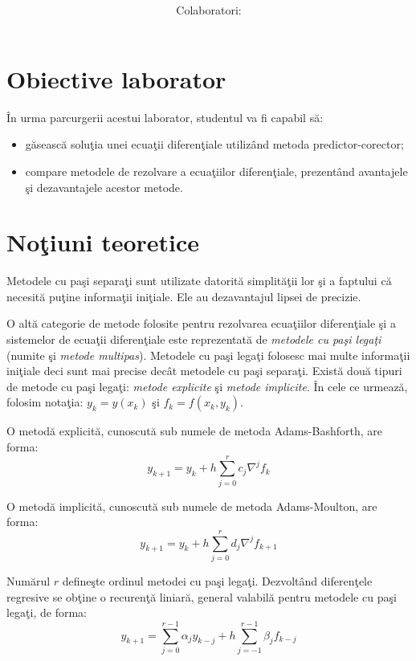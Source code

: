\documentclass{exam}
\title{
	\textmd{\textbf{\MNLabTitle}}
	\author{Colaboratori: \MNAuthor}
}
\begin{document}
\begin{coverpages}

	\maketitle
	\tableofcontents

\end{coverpages}

\section{Obiective laborator}

În urma parcurgerii acestui laborator, studentul va fi capabil să:
\begin{itemize}
	\item găsească soluţia unei ecuaţii diferenţiale utilizând metoda predictor-corector;
	\item compare metodele de rezolvare a ecuaţiilor diferenţiale, prezentând avantajele şi dezavantajele acestor metode.
\end{itemize}

\section{Noţiuni teoretice}

Metodele cu paşi separaţi sunt utilizate datorită simplităţii lor şi a faptului că necesită puţine informaţii iniţiale. Ele au dezavantajul lipsei de precizie.

O altă categorie de metode folosite pentru rezolvarea ecuaţiilor diferenţiale şi a sistemelor de ecuaţii diferenţiale este reprezentată de \textit{metodele cu paşi legaţi }(numite şi \textit{metode multipas}). Metodele cu paşi legaţi folosesc mai multe informaţii iniţiale deci sunt mai precise decât metodele cu paşi separaţi. Există două tipuri de metode cu paşi legaţi: \textit{metode explicite} şi \textit{metode implicite}. În cele ce urmează, folosim notaţia: $y_k=y(x_k)$ şi $f_k=f(x_k, y_k) $.

O metodă explicită, cunoscută sub numele de metoda Adams-Bashforth, are forma:
$$y_{k+1} = y_{k} + h \sum_{j=0}^{r} {c_{j}} \nabla^{j}f_{k}$$

O metodă implicită, cunoscută sub numele de metoda Adams-Moulton, are forma:
$$y_{k+1} = y_{k} + h \sum_{j=0}^{r} {d_{j}} \nabla^{j}f_{k+1}$$

Numărul $r$ defineşte ordinul metodei cu paşi legaţi. Dezvoltând diferenţele regresive se obţine o recurenţă liniară, general valabilă pentru metodele cu paşi legaţi, de forma:
$$y_{k+1} = \sum_{j=0}^{r-1}{ \alpha_{j} y_{k-j} } + h \sum_{j=-1}^{r-1}{ \beta_{j} f_{k-j}}$$
\end{document}
